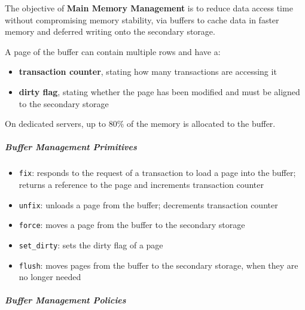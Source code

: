 \documentclass[english]{article}
\begin{document}
The objective of \textbf{Main Memory Management} is to reduce data access time without compromising memory stability, via buffers to cache data in faster memory and deferred writing onto the secondary storage.

A page of the buffer can contain multiple rows and have a:

\begin{itemize}
  \item \textbf{transaction counter}, stating how many transactions are accessing it
  \item \textbf{dirty flag}, stating whether the page has been modified and must be aligned to the secondary storage
\end{itemize}

On dedicated \dbms servers, up to \(80\%\) of the memory is allocated to the buffer.

\subparagraph*{Buffer Management Primitives}

\begin{itemize}[label=\textbf{\texttt{>}}]
  \item \texttt{fix}: responds to the request of a transaction to load a page into the buffer; returns a reference to the page and increments transaction counter
  \item \texttt{unfix}: unloads a page from the buffer; decrements transaction counter
  \item \texttt{force}: moves a page from the buffer to the secondary storage
  \item \texttt{set\_dirty}: sets the dirty flag of a page
  \item \texttt{flush}: moves pages from the buffer to the secondary storage, when they are no longer needed
\end{itemize}

\subparagraph*{Buffer Management Policies}
\end{document}
